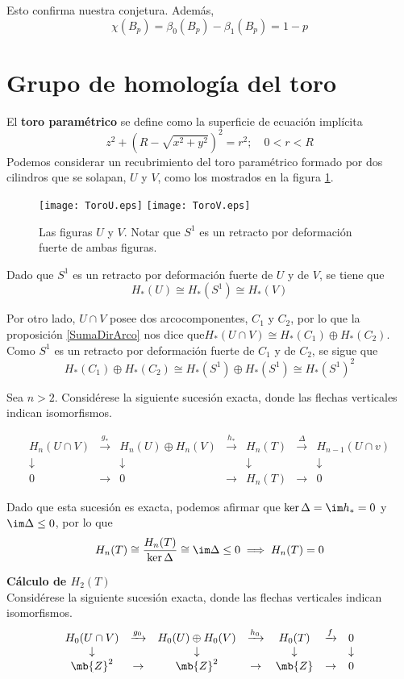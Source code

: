 Esto confirma nuestra conjetura. Además, $$\chi(B_p)=\beta_0(B_p)-\beta_1(B_p)=1-p$$

\section{Grupo de homología del toro}
El \textbf{toro paramétrico} se define como la superficie de ecuación implícita $$z^2+\left(R-\sqrt{x^2+y^2}\right)^2=r^2; \quad 0 < r < R$$ Podemos considerar un recubrimiento del toro paramétrico formado por dos cilindros que se solapan, $U$ y $V$, como los mostrados en la figura \ref{ToroUV}.
\\

\begin{figure}[h]
\centering
\texttt{[image: ToroU.eps]}
\texttt{[image: ToroV.eps]}
\caption{\label{ToroUV} Las figuras $U$ y $V$. Notar que $S^1$ es un retracto por deformación fuerte de ambas figuras.}
\end{figure}

Dado que $S^1$ es un retracto por deformación fuerte de $U$ y de $V$, se tiene que $$H_*(U) \cong H_*(S^1)\cong H_*(V)$$

Por otro lado, $U\cap V$ posee dos arcocomponentes, $C_1$ y $C_2$, por lo que la proposición \ref{SumaDirArco} nos dice que$ H_*(U\cap V) \cong H_*(C_1)\oplus H_*(C_2)$. Como $S^1$ es un retracto por deformación fuerte de $C_1$ y de $C_2$, se sigue que $$H_*(C_1)\oplus H_*(C_2) \cong H_*(S^1)\oplus H_*(S^1)\cong H_*(S^1)^2$$

Sea $n > 2$. Considérese la siguiente sucesión exacta, donde las flechas verticales indican isomorfismos.

\[\begin{array}{ccccccc}
H_n(U \cap V)	&\xrightarrow{g_*}	&H_n(U)\oplus H_n(V)	&\xrightarrow{h_*}	& H_n(T)		&\xrightarrow{\Delta}&H_{n-1}(U \cap v)\\
\downarrow		&					&\downarrow			&					&\downarrow	&					&\downarrow\\
0				&\rightarrow			&0					&\rightarrow			&H_n(T)		&\rightarrow			&0
\end{array}\]

Dado que esta sucesión es exacta, podemos afirmar que $\ker \Delta=\im h_*=0$ y $\im \Delta \leq 0$, por lo que $$H_n(T) \cong \frac{H_n(T)}{\ker \Delta} \cong \im \Delta \leq 0 \implies H_n(T)=0$$

\noindent\textbf{Cálculo de $H_2(T)$}
\\
Considérese la siguiente sucesión exacta, donde las flechas verticales indican isomorfismos.
\[\begin{array}{ccccccc}
H_0(U \cap V)	&\xrightarrow{g_0}	&H_0(U)\oplus H_0(V)	&\xrightarrow{h_0}	&H_0(T)		&\xrightarrow{f}&0\\
\downarrow		&					&\downarrow			&					&\downarrow	&					&\downarrow\\
\mb{Z}^2			&\rightarrow			&\mb{Z}^2			&\rightarrow			&\mb{Z}		&\rightarrow			&0
\end{array}\]

